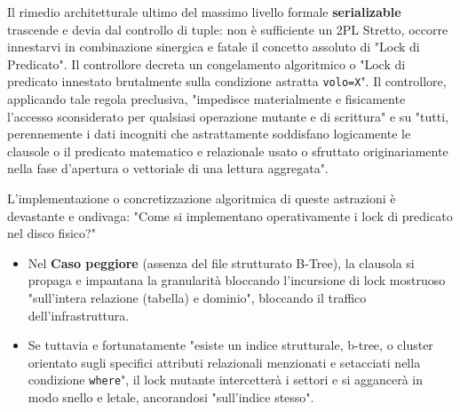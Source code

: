 Il rimedio architetturale ultimo del massimo livello formale \textbf{serializable} trascende e devia dal controllo di tuple: non è sufficiente un 2PL Stretto, occorre innestarvi in combinazione sinergica e fatale il concetto assoluto di "Lock di Predicato". Il controllore decreta un congelamento algoritmico o "Lock di predicato innestato brutalmente sulla condizione astratta \texttt{volo=X}". Il controllore, applicando tale regola preclusiva, "impedisce materialmente e fisicamente l'accesso sconsiderato per qualsiasi operazione mutante e di scrittura" e su "tutti, perennemente i dati incogniti che astrattamente soddisfano logicamente le clausole o il predicato matematico e relazionale usato o sfruttato originariamente nella fase d'apertura o vettoriale di una lettura aggregata".

L'implementazione o concretizzazione algoritmica di queste astrazioni è devastante e ondivaga:
"Come si implementano operativamente i lock di predicato nel disco fisico?"
\begin{itemize}
    \item Nel \textbf{Caso peggiore} (assenza del file strutturato B-Tree), la clausola si propaga e impantana la granularità bloccando l'incursione di lock mostruoso "sull'intera relazione (tabella) e dominio", bloccando il traffico dell'infrastruttura.
    \item Se tuttavia e fortunatamente "esiste un indice strutturale, b-tree, o cluster orientato sugli specifici attributi relazionali menzionati e setacciati nella condizione \texttt{where}", il lock mutante intercetterà i settori e si aggancerà in modo snello e letale, ancorandosi "sull'indice stesso".
\end{itemize}
